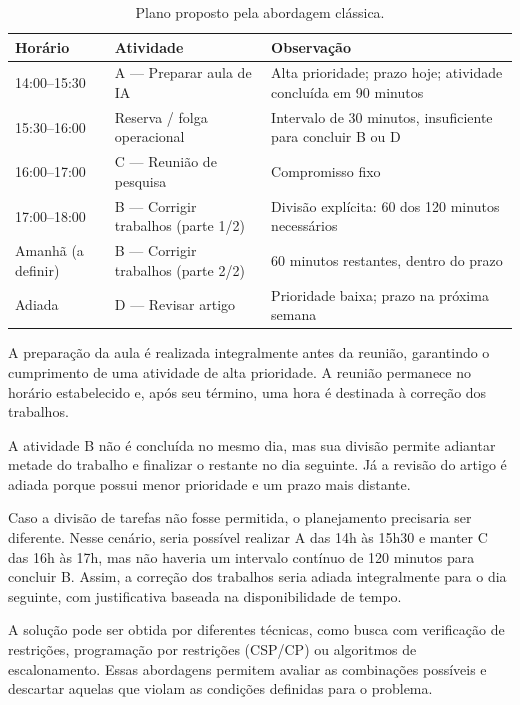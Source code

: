 \documentclass[12pt, a4paper]{article}
\begin{document}
\begin{table}[H]
  \centering
  \small
  \caption{Plano proposto pela abordagem clássica.}
  \label{tab:q11_plano}
  \begin{tabular}{@{}p{3.2cm}p{5.2cm}p{5.2cm}@{}}
    \toprule
    \textbf{Horário} & \textbf{Atividade} & \textbf{Ob\-ser\-va\-ção} \\
    \midrule
    14:00--15:30 & A --- Preparar aula de IA & Alta prioridade; prazo hoje; atividade concluída em 90 minutos \\
    15:30--16:00 & Reserva / folga operacional & Intervalo de 30 minutos, insuficiente para concluir B ou D \\
    16:00--17:00 & C --- Reunião de pesquisa & Compromisso fixo \\
    17:00--18:00 & B --- Corrigir trabalhos (parte 1/2) & Divisão explícita: 60 dos 120 minutos ne\-ces\-sá\-rios \\
    Amanhã (a definir\allowbreak ) & B --- Corrigir trabalhos (parte 2/2) & 60 minutos restantes, dentro do prazo \\
    Adiada & D --- Revisar artigo & Prioridade baixa; prazo na próxima semana \\
    \bottomrule
  \end{tabular}
\end{table}

A preparação da aula é realizada integralmente antes da reunião, garantindo o cumprimento de uma atividade de alta prioridade. A reunião permanece no horário estabelecido e, após seu término, uma hora é destinada à correção dos trabalhos.

A atividade B não é concluída no mesmo dia, mas sua divisão permite adiantar metade do trabalho e finalizar o restante no dia seguinte. Já a revisão do artigo é adiada porque possui menor prioridade e um prazo mais distante.

Caso a divisão de tarefas não fosse permitida, o planejamento precisaria ser diferente. Nesse cenário, seria possível realizar A das 14h às 15h30 e manter C das 16h às 17h, mas não haveria um intervalo contínuo de 120 minutos para concluir B. Assim, a correção dos trabalhos seria adiada integralmente para o dia seguinte, com justificativa baseada na disponibilidade de tempo.

A solução pode ser obtida por diferentes técnicas, como busca com verificação de restrições, programação por restrições (CSP/CP) ou algoritmos de escalonamento. Essas abordagens permitem avaliar as combinações possíveis e descartar aquelas que violam as condições definidas para o problema.
\end{document}

